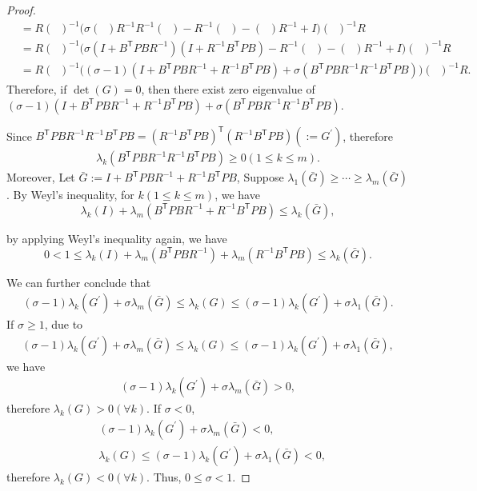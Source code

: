 \documentclass{article}
\newcommand{\transpose}{\mathsf{T}}
\DeclareMathOperator{\tempRBP}{R + B^{\transpose}PB}
\begin{document}
\begin{proof}
\begin{align*}
        &= R(\tempRBP)^{-1}\bigg(\sigma(\tempRBP)R^{-1}R^{-1}(\tempRBP) - R^{-1}(\tempRBP) - (\tempRBP)R^{-1} + I \bigg)(\tempRBP)^{-1}R\\
        &= R(\tempRBP)^{-1}\bigg(\sigma(I+B^{\transpose}PBR^{-1})(I+R^{-1}B^{\transpose}PB) - R^{-1}(\tempRBP) - (\tempRBP)R^{-1} + I \bigg)(\tempRBP)^{-1}R\\
        &= R(\tempRBP)^{-1}\bigg((\sigma-1)(I+B^{\transpose}PBR^{-1}+R^{-1}B^{\transpose}PB) + \sigma(B^{\transpose}PBR^{-1}R^{-1}B^{\transpose}PB)\bigg)(\tempRBP)^{-1}R.
    \end{align*}
    Therefore, if $\det(G) = 0$, then there exist zero eigenvalue of $(\sigma-1)(I+B^{\transpose}PBR^{-1}+R^{-1}B^{\transpose}PB) + \sigma(B^{\transpose}PBR^{-1}R^{-1}B^{\transpose}PB)$.

    Since $B^{\transpose}PBR^{-1}R^{-1}B^{\transpose}PB = (R^{-1}B^{\transpose}PB)^{\transpose}(R^{-1}B^{\transpose}PB)(:= G^{'})$, therefore
    \begin{align*}
        \lambda_{k}(B^{\transpose}PBR^{-1}R^{-1}B^{\transpose}PB) \geq 0(1\leq k \leq m).
    \end{align*}
    Moreover, Let $\bar{G} := I+B^{\transpose}PBR^{-1}+R^{-1}B^{\transpose}PB$, 
    Suppose $\lambda_{1}(\bar{G}) \geq \cdots \geq \lambda_{m}(\bar{G})$. By Weyl's inequality, for $k(1\leq k \leq m)$, we have
    \begin{equation}\label{eq:eigenStep3}
        \lambda_{k}(I) + \lambda_{m}(B^{\transpose}PBR^{-1}+R^{-1}B^{\transpose}PB) \leq \lambda_{k}(\bar{G}),
    \end{equation}
    
    by applying Weyl's inequality again, we have
    \begin{equation}\label{eq:eigenStep4}
        0 < 1 \leq \lambda_{k}(I) + \lambda_{m}(B^{\transpose}PBR^{-1})+\lambda_{m}(R^{-1}B^{\transpose}PB) \leq \lambda_{k}(\bar{G}).
    \end{equation}

     We can further conclude that
     \begin{align}
         (\sigma-1)\lambda_{k}(G^{'})+\sigma\lambda_{m}(\bar{G}) \leq \lambda_{k}(G) \leq (\sigma-1)\lambda_{k}(G^{'})+\sigma\lambda_{1}(\bar{G}).
     \end{align}
     If $\sigma \geq 1$, due to
     \begin{align}
         (\sigma-1)\lambda_{k}(G^{'})+\sigma\lambda_{m}(\bar{G}) \leq \lambda_{k}(G) \leq (\sigma-1)\lambda_{k}(G^{'})+\sigma\lambda_{1}(\bar{G}),
     \end{align}
     we have
     \begin{align*}
         (\sigma-1)\lambda_{k}(G^{'})+\sigma\lambda_{m}(\bar{G}) > 0,
     \end{align*}
     therefore $\lambda_{k}(G) > 0(\forall k)$. If $\sigma < 0$, 
     \begin{align*}
         &(\sigma-1)\lambda_{k}(G^{'})+\sigma\lambda_{m}(\bar{G}) < 0,\\
         &\lambda_{k}(G) \leq (\sigma-1)\lambda_{k}(G^{'})+\sigma\lambda_{1}(\bar{G}) < 0,
     \end{align*}
     therefore $\lambda_{k}(G) < 0(\forall k)$. Thus, $0 \leq \sigma < 1$.


\end{proof}
\end{document}
